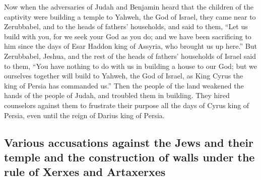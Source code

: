  Now when the adversaries of Judah and Benjamin heard that
the children of the captivity were building a temple to Yahweh, the God
of Israel,  they came near to Zerubbabel, and to the heads
of fathers' households, and said to them, ``Let us build with you, for
we seek your God as you do; and we have been sacrificing to him since
the days of Esar Haddon king of Assyria, who brought us up here.''
 But Zerubbabel, Jeshua, and the rest of the heads of
fathers' households of Israel said to them, ``You have nothing to do
with us in building a house to our God; but we ourselves together will
build to Yahweh, the God of Israel, as King Cyrus the king of Persia has
commanded us.''  Then the people of the land weakened the
hands of the people of Judah, and troubled them in building.
 They hired counselors against them to frustrate their
purpose all the days of Cyrus king of Persia, even until the reign of
Darius king of Persia.

\hypertarget{various-accusations-against-the-jews-and-their-temple-and-the-construction-of-walls-under-the-rule-of-xerxes-and-artaxerxes}{%
\subsection{Various accusations against the Jews and their temple and
the construction of walls under the rule of Xerxes and
Artaxerxes}\label{various-accusations-against-the-jews-and-their-temple-and-the-construction-of-walls-under-the-rule-of-xerxes-and-artaxerxes}}

